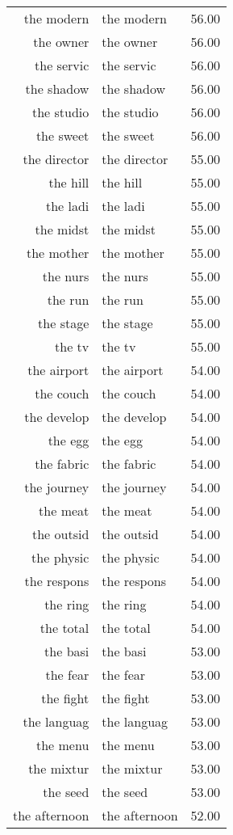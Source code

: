 \begin{table}[ht]
\begin{tabular}{rlr}
  the modern & the modern & 56.00 \\ 
  the owner & the owner & 56.00 \\ 
  the servic & the servic & 56.00 \\ 
  the shadow & the shadow & 56.00 \\ 
  the studio & the studio & 56.00 \\ 
  the sweet & the sweet & 56.00 \\ 
  the director & the director & 55.00 \\ 
  the hill & the hill & 55.00 \\ 
  the ladi & the ladi & 55.00 \\ 
  the midst & the midst & 55.00 \\ 
  the mother & the mother & 55.00 \\ 
  the nurs & the nurs & 55.00 \\ 
  the run & the run & 55.00 \\ 
  the stage & the stage & 55.00 \\ 
  the tv & the tv & 55.00 \\ 
  the airport & the airport & 54.00 \\ 
  the couch & the couch & 54.00 \\ 
  the develop & the develop & 54.00 \\ 
  the egg & the egg & 54.00 \\ 
  the fabric & the fabric & 54.00 \\ 
  the journey & the journey & 54.00 \\ 
  the meat & the meat & 54.00 \\ 
  the outsid & the outsid & 54.00 \\ 
  the physic & the physic & 54.00 \\ 
  the respons & the respons & 54.00 \\ 
  the ring & the ring & 54.00 \\ 
  the total & the total & 54.00 \\ 
  the basi & the basi & 53.00 \\ 
  the fear & the fear & 53.00 \\ 
  the fight & the fight & 53.00 \\ 
  the languag & the languag & 53.00 \\ 
  the menu & the menu & 53.00 \\ 
  the mixtur & the mixtur & 53.00 \\ 
  the seed & the seed & 53.00 \\ 
  the afternoon & the afternoon & 52.00 \\ 

\end{tabular}
\end{table}
